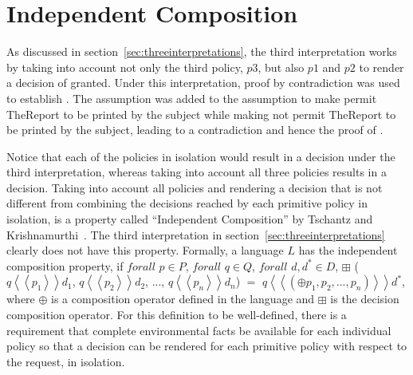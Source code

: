 \section{Independent Composition}

As discussed in section~\ref{sec:threeinterpretations}, the third interpretation works by taking into account not only the third policy, $p3$, but also $p1$ and $p2$ to render a decision of granted. Under this interpretation, proof by contradiction was used to establish . The assumption  was added to the assumption  to make  permit TheReport to be printed by the subject while making  not permit TheReport to be printed by the subject, leading to a contradiction and hence the proof of . 

Notice that each of the policies in isolation would result in a  decision under the third interpretation, whereas taking into account all three policies results in a  decision. Taking into account all policies and rendering a decision that is not different from combining the decisions reached by each primitive policy in isolation, is a property called ``Independent Composition'' by Tschantz and Krishnamurthi~\cite{Tschantz}. The third interpretation in section~\ref{sec:threeinterpretations} clearly does not have this property. Formally, a language $L$ has the independent composition property, if $forall$ $p \in P$, $forall$ $q \in Q$, $forall$ $d, d^\ast \in D$, $\boxplus$ ($q \left\langle\left\langle p_{1}  \right\rangle\right\rangle d_{1}$, $q \left\langle\left\langle p_{2}  \right\rangle\right\rangle d_{2}$, ..., $q \left\langle\left\langle p_{n}  \right\rangle\right\rangle d_{n}$) $=$ $q \left\langle\left\langle (\oplus p_{1}, p_{2}, ..., p_{n}) \right\rangle\right\rangle d^\ast$, \\where $\oplus$ is a composition operator defined in the language and $\boxplus$ is the decision composition operator. For this definition to be well-defined, there is a requirement that complete environmental facts be available for each individual policy so that a decision can be rendered for each primitive policy with respect to the request, in isolation.

